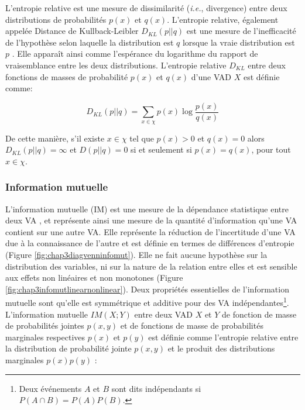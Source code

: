 L'entropie relative est une mesure de dissimilarité (\textit{i.e.}, divergence) entre deux distributions de probabilités $p(x)$ et $q(x)$. 
L'entropie relative, également appelée Distance de Kullback-Leibler $D_{KL}(p||q)$ est une mesure de l'inefficacité de l'hypothèse selon laquelle la distribution est $q$ lorsque la vraie distribution est $p$ \citep{cover2006}. 
Elle apparaît ainsi comme l'espérance du logarithme du rapport de vraisemblance entre les deux distributions. 
L'entropie relative $D_{KL}$ entre deux fonctions de masses de probabilité $p(x)$ et $q(x)$ d'une VAD $X$ est définie comme:

\begin{equation}
D_{KL}(p||q) =  \sum_{x \in \chi} p(x) \log \frac{p(x)}{q(x)}
\end{equation}

De cette manière, s'il existe $x \in \chi$ tel que $p(x) > 0$ et $q(x)=0$ alors $D_{KL}(p||q)=\infty$ et $D(p||q) = 0$ si et seulement si $p(x) = q(x)$, pour tout $x \in \chi$. 

\subsubsection{Information mutuelle}
\label{infomut}

L'information mutuelle (IM) est une mesure de la dépendance statistique entre deux VA \citep{cover2006, latham2009mutual}, et représente ainsi une mesure de la quantité d'information qu'une VA contient sur une autre VA. 
Elle représente la réduction de l'incertitude d'une VA due à la connaissance de l'autre et est définie en termes de différences d'entropie (Figure \ref{fig:chap3diagvenninfomut}). 
Elle ne fait aucune hypothèse sur la distribution des variables, ni sur la nature de la relation entre elles et est sensible aux effets non linéaires et non monotones (Figure \ref{fig:chap3infomutlinearnonlinear}). 
Deux propriétés essentielles de l'information mutuelle sont qu'elle est symmétrique et additive pour des VA indépendantes\footnote{Deux événements $A$ et $B$ sont dits indépendants si $P(A \cap B)=P(A)P(B)$.}. 
L'information mutuelle $IM(X;Y)$ entre deux VAD $X$ et $Y$ de fonction de masse de probabilités jointes $p(x,y)$ et de fonctions de masse de probabilités marginales respectives $p(x)$ et $p(y)$ est définie comme l'entropie relative entre la distribution de probabilité jointe $p(x,y)$ et le produit des distributions marginales $p(x)p(y)$ :

